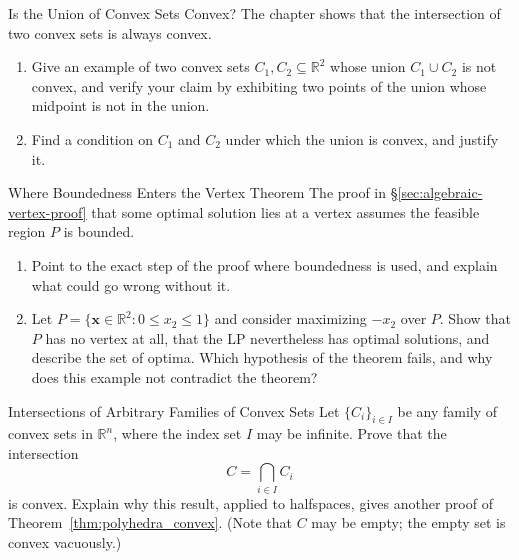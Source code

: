 
\begin{ex}{Is the Union of Convex Sets Convex?}{}
\label{ex:union-convex}
The chapter shows that the intersection of two convex sets is always convex.
\begin{enumerate}
    \item Give an example of two convex sets \( C_1, C_2 \subseteq \mathbb{R}^2 \) whose union \( C_1 \cup C_2 \) is not convex, and verify your claim by exhibiting two points of the union whose midpoint is not in the union.
    \item Find a condition on \( C_1 \) and \( C_2 \) under which the union is convex, and justify it.
\end{enumerate}
\exrefs{\S\ref{sec:convexity}}
\end{ex}

\begin{ex}{Where Boundedness Enters the Vertex Theorem}{}
\label{ex:boundedness-vertex}
The proof in \S\ref{sec:algebraic-vertex-proof} that some optimal solution lies at a vertex assumes the feasible region \( P \) is bounded.
\begin{enumerate}
    \item Point to the exact step of the proof where boundedness is used, and explain what could go wrong without it.
    \item Let \( P = \{ \mathbf{x} \in \mathbb{R}^2 : 0 \leq x_2 \leq 1 \} \) and consider maximizing \( -x_2 \) over \( P \). Show that \( P \) has no vertex at all, that the LP nevertheless has optimal solutions, and describe the set of optima. Which hypothesis of the theorem fails, and why does this example not contradict the theorem?
\end{enumerate}
\exrefs{\S\ref{sec:algebraic-vertex-proof}}
\end{ex}


\begin{ex}{Intersections of Arbitrary Families of Convex Sets}{}
\label{ex:intersection-family}
Let \( \{ C_i \}_{i \in I} \) be any family of convex sets in \( \mathbb{R}^n \), where the index set \( I \) may be infinite. Prove that the intersection
\[
C = \bigcap_{i \in I} C_i
\]
is convex. Explain why this result, applied to halfspaces, gives another proof of Theorem~\ref{thm:polyhedra_convex}. (Note that \( C \) may be empty; the empty set is convex vacuously.)
\end{ex}

